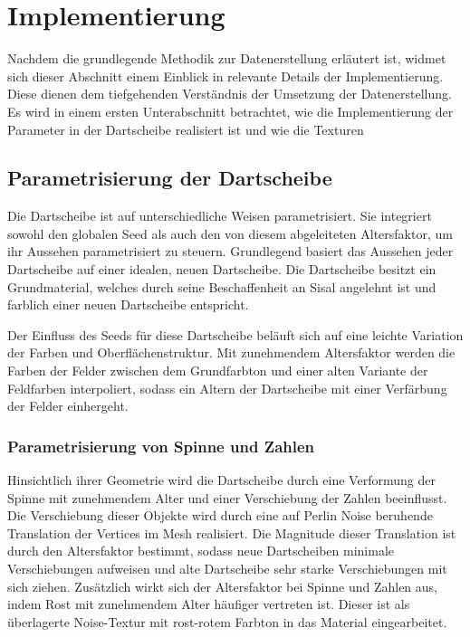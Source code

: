 
\section{Implementierung}
\label{sec:daten:implementierung}

Nachdem die grundlegende Methodik zur Datenerstellung erläutert ist, widmet sich dieser Abschnitt einem Einblick in relevante Details der Implementierung. Diese dienen dem tiefgehenden Verständnis der Umsetzung der Datenerstellung. Es wird in einem ersten Unterabschnitt betrachtet, wie die Implementierung der Parameter in der Dartscheibe realisiert ist und wie die Texturen 


\subsection{Parametrisierung der Dartscheibe}  %
\label{sec:dartscheibe_parametrisierung}

Die Dartscheibe ist auf unterschiedliche Weisen parametrisiert. Sie integriert sowohl den globalen Seed als auch den von diesem abgeleiteten Altersfaktor, um ihr Aussehen parametrisiert zu steuern. Grundlegend basiert das Aussehen jeder Dartscheibe auf einer idealen, neuen Dartscheibe. Die Dartscheibe besitzt ein Grundmaterial, welches durch seine Beschaffenheit an Sisal angelehnt ist und farblich einer neuen Dartscheibe entspricht.

Der Einfluss des Seeds für diese Dartscheibe beläuft sich auf eine leichte Variation der Farben und Oberflächenstruktur. Mit zunehmendem Altersfaktor werden die Farben der Felder zwischen dem Grundfarbton und einer alten Variante der Feldfarben interpoliert, sodass ein Altern der Dartscheibe mit einer Verfärbung der Felder einhergeht.

\subsubsection{Parametrisierung von Spinne und Zahlen}

Hinsichtlich ihrer Geometrie wird die Dartscheibe durch eine Verformung der Spinne mit zunehmendem Alter und einer Verschiebung der Zahlen beeinflusst. Die Verschiebung dieser Objekte wird durch eine auf Perlin Noise beruhende Translation der Vertices im Mesh realisiert. Die Magnitude dieser Translation ist durch den Altersfaktor bestimmt, sodass neue Dartscheiben minimale Verschiebungen aufweisen und alte Dartscheibe sehr starke Verschiebungen mit sich ziehen. Zusätzlich wirkt sich der Altersfaktor bei Spinne und Zahlen aus, indem Rost mit zunehmendem Alter häufiger vertreten ist. Dieser ist als überlagerte Noise-Textur mit rost-rotem Farbton in das Material eingearbeitet.

